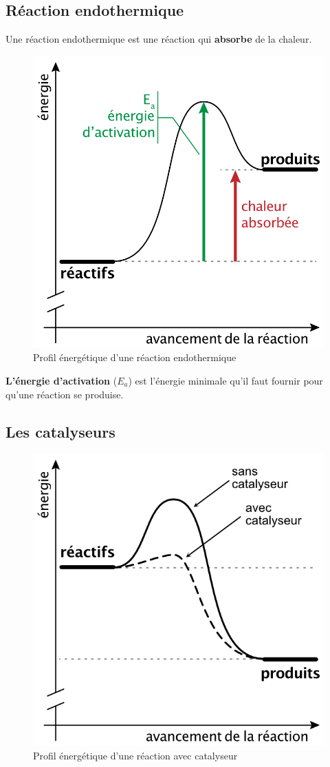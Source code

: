 \documentclass[
  11pt,
  french,
  a4paper,
  openany]{book}
\begin{document}
\hypertarget{ruxe9action-endothermique}{%
\subsection{Réaction endothermique}\label{ruxe9action-endothermique}}

Une réaction endothermique est une réaction qui \textbf{absorbe} de la chaleur.

\begin{figure}

{\centering \includegraphics[width=0.33\linewidth]{images/chaleur-2} 

}

\caption{Profil énergétique d'une réaction endothermique}\label{fig:chaleur-2}
\end{figure}

\textbf{L'énergie d'activation} (\(E_a\)) est l'énergie minimale qu'il faut fournir pour qu'une réaction se produise.

\hypertarget{les-catalyseurs}{%
\subsection{Les catalyseurs}\label{les-catalyseurs}}

\begin{figure}

{\centering \includegraphics[width=0.33\linewidth]{images/catalyseur} 

}

\caption{Profil énergétique d'une réaction avec catalyseur}\label{fig:catalyseur}
\end{figure}
\end{document}
